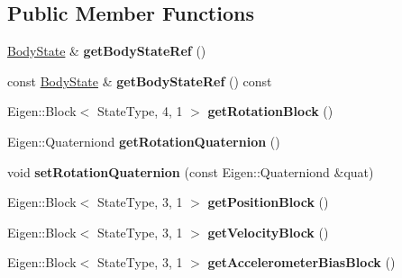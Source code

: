 \subsection*{Public Member Functions}
\begin{DoxyCompactItemize}
\item 
\hypertarget{class_filter_state_a595c5e8bfb709f9a73346300345728bb}{\hyperlink{class_body_state}{Body\-State} \& {\bfseries get\-Body\-State\-Ref} ()}\label{class_filter_state_a595c5e8bfb709f9a73346300345728bb}

\item 
\hypertarget{class_filter_state_afae8c864f77190b9a870dfe88d821a77}{const \hyperlink{class_body_state}{Body\-State} \& {\bfseries get\-Body\-State\-Ref} () const }\label{class_filter_state_afae8c864f77190b9a870dfe88d821a77}

\item 
\hypertarget{class_filter_state_a549088ec74cb2262e397b929abc174d2}{Eigen\-::\-Block$<$ State\-Type, 4, 1 $>$ {\bfseries get\-Rotation\-Block} ()}\label{class_filter_state_a549088ec74cb2262e397b929abc174d2}

\item 
\hypertarget{class_filter_state_a5f61beb08bf43811cebea645c80949ac}{Eigen\-::\-Quaterniond {\bfseries get\-Rotation\-Quaternion} ()}\label{class_filter_state_a5f61beb08bf43811cebea645c80949ac}

\item 
\hypertarget{class_filter_state_ab2a6e477d01da9521267781a73757838}{void {\bfseries set\-Rotation\-Quaternion} (const Eigen\-::\-Quaterniond \&quat)}\label{class_filter_state_ab2a6e477d01da9521267781a73757838}

\item 
\hypertarget{class_filter_state_af2dd9af9a0722a05cbc59981cf40aead}{Eigen\-::\-Block$<$ State\-Type, 3, 1 $>$ {\bfseries get\-Position\-Block} ()}\label{class_filter_state_af2dd9af9a0722a05cbc59981cf40aead}

\item 
\hypertarget{class_filter_state_a239c2732f1a3d647c21b96f5d53dd215}{Eigen\-::\-Block$<$ State\-Type, 3, 1 $>$ {\bfseries get\-Velocity\-Block} ()}\label{class_filter_state_a239c2732f1a3d647c21b96f5d53dd215}

\item 
\hypertarget{class_filter_state_a43b485d8c02d6eb8e37cd8f2323e9e43}{Eigen\-::\-Block$<$ State\-Type, 3, 1 $>$ {\bfseries get\-Accelerometer\-Bias\-Block} ()}\label{class_filter_state_a43b485d8c02d6eb8e37cd8f2323e9e43}


\end{DoxyCompactItemize}
